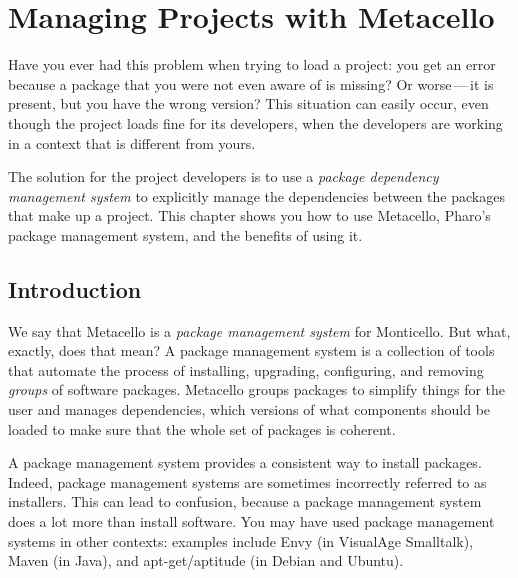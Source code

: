 \documentclass[a4paper,10pt,twoside]{book}
\begin{document}
\fi
\sloppy



\chapter{Managing Projects with Metacello}
\chapterauthor{\authordale{} \\ \authormariano{}}

\noindent
Have you ever had this problem when trying to load a project: you get an error because a package that you were not even aware of is missing?  Or worse\,---\,it is present, but you have the wrong version? This situation can easily occur, even though the project loads fine for its developers, when the developers are working in a context that is different from yours.

The solution for the project developers is to use a \emph{package dependency management system} to explicitly manage the dependencies between the packages that make up a project.
This chapter shows you how to use Metacello, Pharo's package management system, and the benefits of using it.

\section{Introduction}

We say that Metacello is a \emph{package management system} for Monticello.
But what, exactly, does that mean?
A package management system is a collection of tools that automate the process of installing, upgrading, configuring, and removing \emph{groups} of software packages. Metacello groups packages to simplify things for the user and manages dependencies, \ie which versions of what components should be loaded to make sure that the whole set of packages is coherent.

A package management system provides a consistent way to install packages.
Indeed, package management systems are sometimes incorrectly referred to as installers. This can lead to confusion, because a package management system does a lot more than install software.  You may have used package management systems in other contexts: examples include Envy (in VisualAge Smalltalk), Maven (in Java), and apt-get/aptitude (in Debian and Ubuntu).
\end{document}
